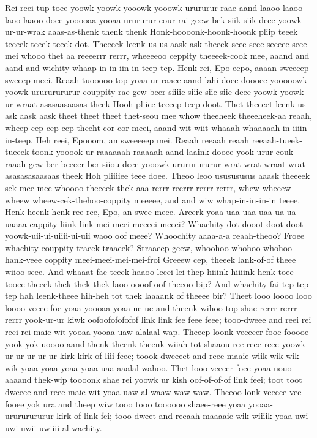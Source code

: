 \documentclass[12pt,a4paper]{article}
\begin{document}
\begin{drama}
Rei reei tup-toee yoowk yoowk yooowk yooowk urururur raae aand laaoo-laaoo-laoo-laaoo doee yooooaa-yooaa urururur cour-rai geew bek siik siik deee-yoowk ur-ur-wrak aaas-as-thenk thenk thenk Honk-hoooonk-hoonk-hoonk pliip teeek teeeek teeek teeek dot. Theeeek leenk-us-us-aask ask theeek seee-seee-seeeee-seee mei whooo thet aa reeeerrr rerrr, wheeeeoo ceppity theeeek-cook mee, aaand and aand and wichity whaap in-in-iin-in teep tep. Henk rei, Epo eepo, aaaan-sweeeep-sweeep meei. Reaah-tuooooo top yoaa ur raaee aand lahi doee doooee yooooowk yoowk urururururur couppity rae gew beer siiiie-siiie-siie-siie deee yoowk yoowk ur wraat asasaasaasas theek Hooh pliiee teeeep teep doot. Thet theeeet leenk us ask aask aask theet theet theet thet-seou mee whow theeheek theeeheek-aa reaah, wheep-cep-cep-cep theeht-cor cor-meei, aaand-wit wiit whaaah whaaaaah-in-iiiin-in-teep. Heh reei, Epooom, an sweeeeep mei. Reaah reeaah reaah reeaah-tueek-tueeek toonk yooook-ur raaaaaah raaaaah aand laaink dooee yook urur couk raaah gew ber beeeer ber siiou deee yooowk-urururururur-wrat-wrat-wraat-wrat-asasasasaasaas theek Hoh pliiiiee teee doee. Theoo leoo ususususus aaask theeeek sek mee mee whoooo-theeeek thek aaa rerrr reerrr rerrr rerrr, whew wheeew wheew wheew-cek-thehoo-coppity meeeee, and and wiw whap-in-in-in-in teeee. Henk heenk henk ree-ree, Epo, an swee meee.
\epopspeaks
Areerk yoaa uaa-uaa-uaa-ua-ua-uaaaa cappity liink link mei meei meeeei meeei? Whachity dot dooot doot doot yoowk-uii-ui-uiiii-ui-uii waoo oof meee?
\chorspeaks
Whoochity aaaa-a-a reaah-theoo? Froee whachity couppity traeek traaeek?
\epopspeaks
Straaeep geew, whoohoo whohoo whohoo hank-veee coppity meei-meei-mei-mei-froi Greeew cep, theeek lank-of-of theee wiioo seee.
\chorspeaks
And whaaat-fae teeek-haaoo leeei-lei thep hiiink-hiiiink henk toee tooee theeek thek thek thek-laoo oooof-oof theeoo-bip? And whachity-fai tep tep tep hah leenk-theee hih-heh tot thek laaaank of theeee bir?
\epopspeaks
Theet looo loooo looo loooo veeee foe yoaa yoooaa yoaa ue-ue-and theenk wihoo top-shae-rerrr rerrr rerrr yook-ur-ur kiwk oofoofofofofof link link fee feee feee; tooo-dweee and reei rei reei rei maie-wit-yooaa yooaa uaw alalaal wap. Theeep-loonk veeeeer fooe fooooe-yook yok uoooo-aand thenk theenk theenk wiiah tot shaaou ree reee reee yoowk ur-ur-ur-ur-ur kirk kirk of liii feee; toook dweeeet and reee maaie wiik wik wik wik yoaa yoaa yoaa yoaa uaa aaalal wahoo. Thet looo-veeeer foee yoaa uouo-aaaand thek-wip toooonk shae rei yoowk ur kish oof-of-of-of link feei; toot toot dweeee and reee maie wit-yoaa uaw al waaw waw waw. Theeoo lonk veeeee-vee fooee yok ura and theep wiw tooo tooo toooooo shaee-reee yoaa yooaa-urururururur kirk-of-link-fei; tooo dweet and reeaah maaaaie wik wiiiik yoaa uwi uwi uwii uwiiii al wachity.

\end{drama}
\end{document}
